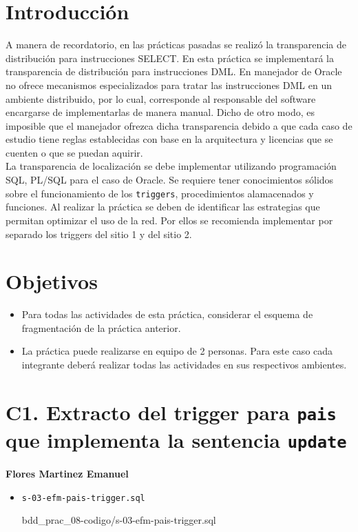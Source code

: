 \documentclass{article}
\newcommand{\codedir}{bdd_prac_08-codigo}
\begin{document}
\newpage

\section*{Introducción}

A manera de recordatorio, en las prácticas pasadas se realizó la transparencia
de distribución para instrucciones SELECT. En esta práctica se implementará la
transparencia de distribución para instrucciones DML. En manejador de Oracle no
ofrece mecanismos especializados para tratar las instrucciones DML en un
ambiente distribuido, por lo cual, corresponde al responsable del software
encargarse de implementarlas de manera manual. Dicho de otro modo, es imposible
que el manejador ofrezca dicha transparencia debido a que cada caso de estudio
tiene reglas establecidas con base en la arquitectura y licencias que se cuenten
o que se puedan aquirir.\\

La transparencia de localización se debe implementar utilizando programación
SQL, PL/SQL para el caso de Oracle. Se requiere tener conocimientos sólidos
sobre el funcionamiento de los \texttt{triggers}, procedimientos alamacenados y
funciones. Al realizar la práctica se deben de identificar las estrategias que
permitan optimizar el uso de la red. Por ellos se recomienda implementar por
separado los triggers del sitio 1 y del sitio 2.


\section*{Objetivos}

\begin{itemize}
  \item Para todas las actividades de esta práctica, considerar el esquema de
  fragmentación de la práctica anterior.  
  \item La práctica puede realizarse en equipo de 2 personas. Para este caso
    cada integrante deberá realizar todas las actividades en sus respectivos
ambientes.
\end{itemize}

\section*{C1. Extracto del trigger para \texttt{pais} que implementa la 
sentencia \texttt{update}}
\textbf{Flores Martinez Emanuel}
\begin{itemize}
  \item \texttt{s-03-efm-pais-trigger.sql}
  
  {\codedir/s-03-efm-pais-trigger.sql}
\end{itemize}
\end{document}
